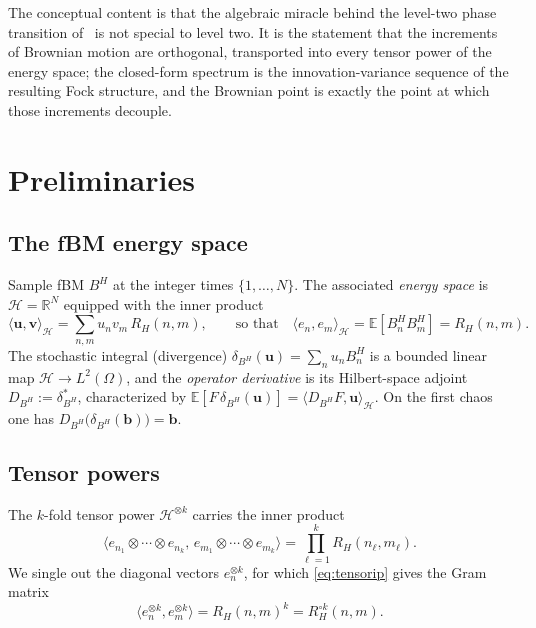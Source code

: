 \documentclass[11pt,reqno]{amsart}
\theoremstyle{plain}
\theoremstyle{definition}
\newcommand{\R}{\mathbb{R}}
\newcommand{\E}{\mathbb{E}}
\newcommand{\HH}{\mathcal{H}}
\newcommand{\Had}{\mathbin{\circ}}     %
\newcommand{\Bm}{B^{H}}
\begin{document}
The conceptual content is that the algebraic miracle behind the level-two phase
transition of~\cite{FontesPartI} is not special to level two. It is the
statement that the increments of Brownian motion are orthogonal, transported into
every tensor power of the energy space; the closed-form spectrum is the
innovation-variance sequence of the resulting Fock structure, and the Brownian
point is exactly the point at which those increments decouple.

\section{Preliminaries}\label{sec:prelim}

\subsection{The fBM energy space}
Sample fBM $\Bm$ at the integer times $\{1,\dots,N\}$. The associated
\emph{energy space} is $\HH=\R^{N}$ equipped with the inner product
\begin{equation}\label{eq:energy}
  \langle\mathbf u,\mathbf v\rangle_{\HH}=\sum_{n,m}u_n v_m\,R_H(n,m),
  \qquad\text{so that}\quad
  \langle e_n,e_m\rangle_{\HH}=\E[\Bm_n\Bm_m]=R_H(n,m).
\end{equation}
The stochastic integral (divergence) $\delta_{\Bm}(\mathbf u)=\sum_n u_n\Bm_n$ is
a bounded linear map $\HH\to L^2(\Omega)$, and the \emph{operator derivative} is
its Hilbert-space adjoint $D_{\Bm}:=\delta_{\Bm}^{*}$, characterized by
$\E[F\,\delta_{\Bm}(\mathbf u)]=\langle D_{\Bm}F,\mathbf u\rangle_{\HH}$. On the
first chaos one has $D_{\Bm}\bigl(\delta_{\Bm}(\mathbf b)\bigr)=\mathbf b$.

\subsection{Tensor powers}
The $k$-fold tensor power $\HH^{\otimes k}$ carries the inner product
\begin{equation}\label{eq:tensorip}
  \bigl\langle e_{n_1}\otimes\cdots\otimes e_{n_k},\,
  e_{m_1}\otimes\cdots\otimes e_{m_k}\bigr\rangle
  =\prod_{\ell=1}^{k}R_H(n_\ell,m_\ell).
\end{equation}
We single out the diagonal vectors $e_n^{\otimes k}$, for which
\eqref{eq:tensorip} gives the Gram matrix
\begin{equation}\label{eq:gram}
  \bigl\langle e_n^{\otimes k},e_m^{\otimes k}\bigr\rangle
  =R_H(n,m)^{k}=R_H^{\Had k}(n,m).
\end{equation}
\end{document}
